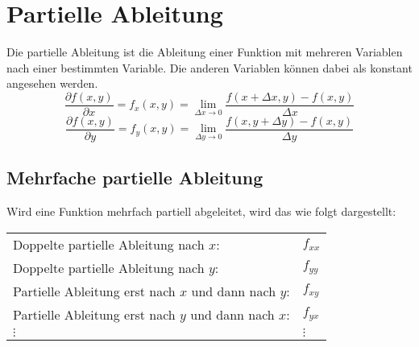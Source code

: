 



\section{Partielle Ableitung}
Die partielle Ableitung ist die Ableitung einer Funktion mit mehreren 
Variablen nach einer bestimmten Variable. Die anderen Variablen können dabei 
als konstant angesehen werden. 
\[ \boxed{\frac{\partial f(x,y)}{\partial x} = f_x(x,y) 
= \lim_{\Delta x \to 0} \frac{f(x + \Delta x, y) - f(x, y)}{\Delta x}} \]
\[ \boxed{\frac{\partial f(x,y)}{\partial y} = f_y(x,y) 
= \lim_{\Delta y \to 0} \frac{f(x, y + \Delta y) - f(x, y)}{\Delta y}} \]

\subsection{Mehrfache partielle Ableitung}
Wird eine Funktion mehrfach partiell abgeleitet, wird das wie folgt 
dargestellt: 
\newline
\begin{tabular}{@{}ll}
Doppelte partielle Ableitung nach $x$:          &$f_{xx}$ \\
Doppelte partielle Ableitung nach $y$:          &$f_{yy}$ \\
Partielle Ableitung erst nach $x$ und dann nach $y$: &$f_{xy}$ \\
Partielle Ableitung erst nach $y$ und dann nach $x$: &$f_{yx}$ \\
$\vdots$ & $\vdots$ 
\end{tabular} \\

